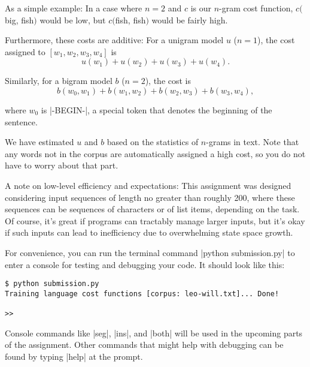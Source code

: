 As a simple example: In a case where $n=2$ and $c$ is our $n$-gram cost
function, $c(${\sf big}, {\sf fish}$)$ would be low, but $c(${\sf fish},
{\sf fish}$)$ would be fairly high.

Furthermore, these costs are additive: For a unigram model $u$ ($n = 1$), the
cost assigned to $[w_1, w_2, w_3, w_4]$ is
\[
u(w_1) + u(w_2) + u(w_3) + u(w_4).
\]

Similarly, for a bigram model $b$ ($n = 2$), the cost is
\[
b(w_0, w_1) +
b(w_1, w_2) +
b(w_2, w_3) +
b(w_3, w_4),
\]

where $w_0$ is |-BEGIN-|, a special token that denotes the beginning of the
sentence.

We have estimated $u$ and $b$ based on the statistics of $n$-grams in text. Note
that any words not in the corpus are automatically assigned a high cost, so you
do not have to worry about that part.

A note on low-level efficiency and expectations: This assignment was designed
considering input sequences of length no greater than roughly 200, where these
sequences can be sequences of characters or of list items, depending on the
task.  Of course, it's great if programs can tractably manage larger inputs, but
it's okay if such inputs can lead to inefficiency due to overwhelming state
space growth.

For convenience, you can run the terminal command |python submission.py| to
enter a console for testing and debugging your code.  It should look like this:
\begin{lstlisting}
$ python submission.py
Training language cost functions [corpus: leo-will.txt]... Done!

>> 
\end{lstlisting}

Console commands like |seg|, |ins|, and |both| will be used in the upcoming
parts of the assignment.  Other commands that might help with debugging can be
found by typing |help| at the prompt.
